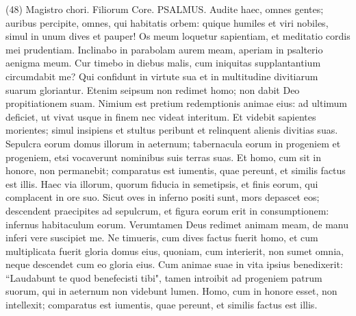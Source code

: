 \begin{biblechapter}  (48) 
\verse  Magistro chori. Filiorum Core. PSALMUS. 
\verse Audite haec, omnes gentes; auribus percipite, omnes, qui habitatis orbem: 
\verse quique humiles et viri nobiles, simul in unum dives et pauper! 
\verse Os meum loquetur sapientiam, et meditatio cordis mei prudentiam. 
\verse Inclinabo in parabolam aurem meam, aperiam in psalterio aenigma meum. 
\verse Cur timebo in diebus malis, cum iniquitas supplantantium circumdabit me? 
\verse Qui confidunt in virtute sua et in multitudine divitiarum suarum gloriantur. 
\verse Etenim seipsum non redimet homo; non dabit Deo propitiationem suam. 
\verse Nimium est pretium redemptionis animae eius: ad ultimum deficiet, 
\verse ut vivat usque in finem nec videat interitum. 
\verse Et videbit sapientes morientes; simul insipiens et stultus peribunt et relinquent alienis divitias suas. 
\verse Sepulcra eorum domus illorum in aeternum; tabernacula eorum in progeniem et progeniem, etsi vocaverunt nominibus suis terras suas. 
\verse Et homo, cum sit in honore, non permanebit; comparatus est iumentis, quae pereunt, et similis factus est illis. 
\verse Haec via illorum, quorum fiducia in semetipsis, et finis eorum, qui complacent in ore suo. 
\verse Sicut oves in inferno positi sunt, mors depascet eos; descendent praecipites ad sepulcrum, et figura eorum erit in consumptionem: infernus habitaculum eorum. 
\verse Verumtamen Deus redimet animam meam, de manu inferi vere suscipiet me. 
\verse Ne timueris, cum dives factus fuerit homo, et cum multiplicata fuerit gloria domus eius, 
\verse quoniam, cum interierit, non sumet omnia, neque descendet cum eo gloria eius. 
\verse Cum animae suae in vita ipsius benedixerit: “Laudabunt te quod benefecisti tibi", 
\verse tamen introibit ad progeniem patrum suorum, qui in aeternum non videbunt lumen. 
\verse Homo, cum in honore esset, non intellexit; comparatus est iumentis, quae pereunt, et similis factus est illis. 
\end{biblechapter}

